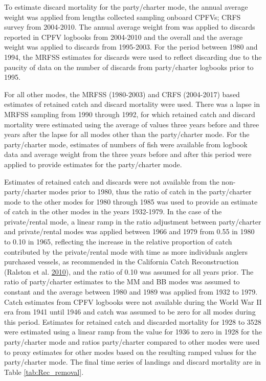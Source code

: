 \documentclass[12pt,]{article}
\begin{document}
To estimate discard mortality for the party/charter mode, the annual
average weight was applied from lengths collected sampling onboard
CPFVs; CRFS survey from 2004-2010. The annual average weight from was
applied to discards reported in CPFV logbooks from 2004-2010 and the
overall and the average weight was applied to discards from 1995-2003.
For the period between 1980 and 1994, the MRFSS estimates for discards
were used to reflect discarding due to the paucity of data on the number
of discards from party/charter logbooks prior to 1995.

For all other modes, the MRFSS (1980-2003) and CRFS (2004-2017) based
estimates of retained catch and discard mortality were used. There was a
lapse in MRFSS sampling from 1990 through 1992, for which retained catch
and discard mortality were estimated using the average of values three
years before and three years after the lapse for all modes other than
the party/charter mode. For the party/charter mode, estimates of numbers
of fish were available from logbook data and average weight from the
three years before and after this period were applied to provide
estimates for the party/charter mode.

Estimates of retained catch and discards were not available from the
non-party/charter modes prior to 1980, thus the ratio of catch in the
party/charter mode to the other modes for 1980 through 1985 was used to
provide an estimate of catch in the other modes in the years 1932-1979.
In the case of the private/rental mode, a linear ramp in the ratio
adjustment between party/charter and private/rental modes was applied
between 1966 and 1979 from 0.55 in 1980 to 0.10 in 1965, reflecting the
increase in the relative proportion of catch contributed by the
private/rental mode with time as more individuals anglers purchased
vessels, as recommended in the California Catch Reconstruction (Ralston
et al. \protect\hyperlink{ref-Ralston2010}{2010}), and the ratio of 0.10
was assumed for all years prior. The ratio of party/charter estimates to
the MM and BB modes was assumed to constant and the average between 1980
and 1989 was applied from 1932 to 1979. Catch estimates from CPFV
logbooks were not available during the World War II era from 1941 until
1946 and catch was assumed to be zero for all modes during this period.
Estimates for retained catch and discarded mortality for 1928 to 3528
were estimated using a linear ramp from the value for 1936 to zero in
1928 for the party/charter mode and ratios party/charter compared to
other modes were used to proxy estimates for other modes based on the
resulting ramped values for the party/charter mode. The final time
series of landings and discard mortality are in Table
\ref{tab:Rec_removal}.
\end{document}

